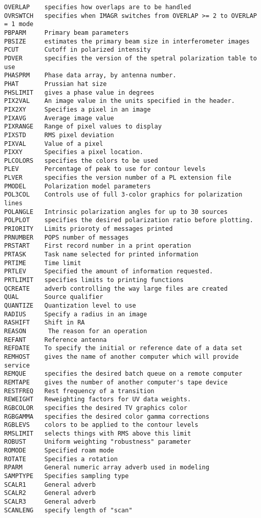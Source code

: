 \begin{verbatim}
OVERLAP    specifies how overlaps are to be handled
OVRSWTCH   specifies when IMAGR switches from OVERLAP >= 2 to OVERLAP = 1 mode
PBPARM     Primary beam parameters
PBSIZE     estimates the primary beam size in interferometer images
PCUT       Cutoff in polarized intensity
PDVER      specifies the version of the spetral polarization table to use
PHASPRM    Phase data array, by antenna number.
PHAT       Prussian hat size
PHSLIMIT   gives a phase value in degrees
PIX2VAL    An image value in the units specified in the header.
PIX2XY     Specifies a pixel in an image
PIXAVG     Average image value
PIXRANGE   Range of pixel values to display
PIXSTD     RMS pixel deviation
PIXVAL     Value of a pixel
PIXXY      Specifies a pixel location.
PLCOLORS   specifies the colors to be used
PLEV       Percentage of peak to use for contour levels
PLVER      specifies the version number of a PL extension file
PMODEL     Polarization model parameters
POL3COL    Controls use of full 3-color graphics for polarization lines
POLANGLE   Intrinsic polarization angles for up to 30 sources
POLPLOT    specifies the desired polarization ratio before plotting.
PRIORITY   Limits prioroty of messages printed
PRNUMBER   POPS number of messages
PRSTART    First record number in a print operation
PRTASK     Task name selected for printed information
PRTIME     Time limit
PRTLEV     Specified the amount of information requested.
PRTLIMIT   specifies limits to printing functions
QCREATE    adverb controlling the way large files are created
QUAL       Source qualifier
QUANTIZE   Quantization level to use
RADIUS     Specify a radius in an image
RASHIFT    Shift in RA
REASON      The reason for an operation
REFANT     Reference antenna
REFDATE    To specify the initial or reference date of a data set
REMHOST    gives the name of another computer which will provide service
REMQUE     specifies the desired batch queue on a remote computer
REMTAPE    gives the number of another computer's tape device
RESTFREQ   Rest frequency of a transition
REWEIGHT   Reweighting factors for UV data weights.
RGBCOLOR   specifies the desired TV graphics color
RGBGAMMA   specifies the desired color gamma corrections
RGBLEVS    colors to be applied to the contour levels
RMSLIMIT   selects things with RMS above this limit
ROBUST     Uniform weighting "robustness" parameter
ROMODE     Specified roam mode
ROTATE     Specifies a rotation
RPARM      General numeric array adverb used in modeling
SAMPTYPE   Specifies sampling type
SCALR1     General adverb
SCALR2     General adverb
SCALR3     General adverb
SCANLENG   specify length of "scan"

\end{verbatim}
